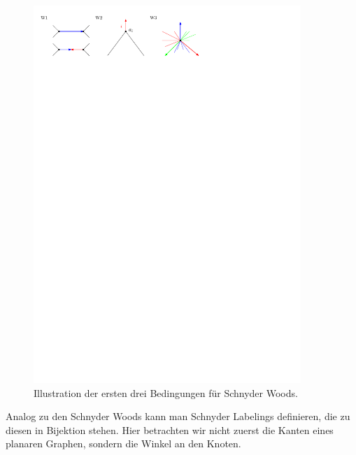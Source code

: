 \begin{figure}[h]
	\centering
  \includegraphics[width=0.9\textwidth]{schnyder_wood_def.pdf}
  \caption{Illustration der ersten drei Bedingungen für Schnyder Woods.}
\end{figure}

Analog zu den Schnyder Woods kann man Schnyder Labelings definieren, die zu diesen in Bijektion stehen. Hier betrachten wir nicht zuerst die Kanten eines planaren Graphen, sondern die Winkel an den Knoten.

